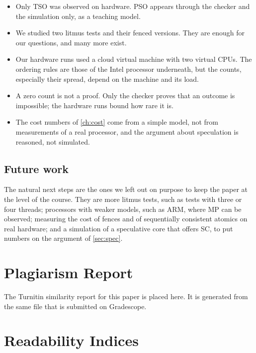 \begin{itemize}
\item Only TSO was observed on hardware. PSO appears through the checker and the simulation only, as a teaching model.
\item We studied two litmus tests and their fenced versions. They are enough for our questions, and many more exist.
\item Our hardware runs used a cloud virtual machine with two virtual CPUs. The ordering rules are those of the Intel processor underneath, but the counts, especially their spread, depend on the machine and its load.
\item A zero count is not a proof. Only the checker proves that an outcome is impossible; the hardware runs bound how rare it is.
\item The cost numbers of \cref{ch:cost} come from a simple model, not from measurements of a real processor, and the argument about speculation is reasoned, not simulated.
\end{itemize}

\section{Future work}

The natural next steps are the ones we left out on purpose to keep the paper at the level of the course. They are more litmus tests, such as tests with three or four threads; processors with weaker models, such as ARM, where MP  can be observed; measuring the cost of fences and of sequentially consistent atomics on real hardware; and a simulation of a speculative core that offers SC, to put numbers on the argument of \cref{sec:spec}.

\appendix
\chapter{Plagiarism Report}
\label{app:plag}

The Turnitin similarity report for this paper is placed here. It is generated from the same file that is submitted on Gradescope.

\chapter{Readability Indices}
\label{app:read}

